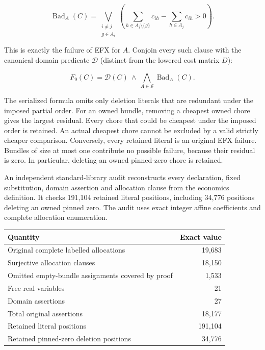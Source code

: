 \documentclass[
  11pt,
]{article}
\newcounter{none} %
\begin{document}
\[
\operatorname{Bad}_A(C)=
\bigvee_{\substack{i\ne j\\g\in A_i}}
\left(\sum_{h\in A_i\setminus\{g\}}c_{ih}
      -\sum_{h\in A_j}c_{ih}>0\right).
\]

This is exactly the failure of EFX for \(A\). Conjoin every such clause
with the canonical domain predicate \(\mathcal D\) (distinct from the
lowered cost matrix \(D\)):

\[
F_9(C)=\mathcal D(C)\ \land\ \bigwedge_{A\in\mathcal S}\operatorname{Bad}_A(C).
\]

The serialized formula omits only deletion literals that are redundant
under the imposed partial order. For an owned bundle, removing a
cheapest owned chore gives the largest residual. Every chore that could
be cheapest under the imposed order is retained. An actual cheapest
chore cannot be excluded by a valid strictly cheaper comparison.
Conversely, every retained literal is an original EFX failure. Bundles
of size at most one contribute no possible failure, because their
residual is zero. In particular, deleting an owned pinned-zero chore is
retained.

An independent standard-library audit reconstructs every declaration,
fixed substitution, domain assertion and allocation clause from the
economics definition. It checks 191,104 retained literal positions,
including 34,776 positions deleting an owned pinned zero. The audit uses
exact integer affine coefficients and complete allocation enumeration.


{\def\LTcaptype{none} %
\begin{longtable}[]{@{}lr@{}}
\toprule\noalign{}
Quantity & Exact value \\
\midrule\noalign{}
\endhead
\bottomrule\noalign{}
\endlastfoot
Original complete labelled allocations & 19,683 \\
Surjective allocation clauses & 18,150 \\
Omitted empty-bundle assignments covered by proof & 1,533 \\
Free real variables & 21 \\
Domain assertions & 27 \\
Total original assertions & 18,177 \\
Retained literal positions & 191,104 \\
Retained pinned-zero deletion positions & 34,776 \\
\end{longtable}
}
\end{document}

